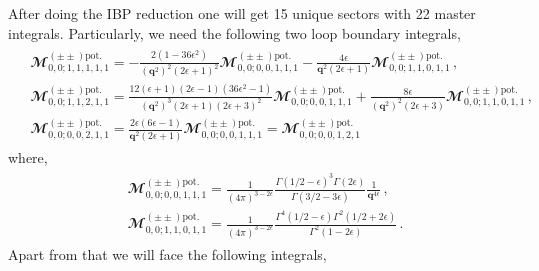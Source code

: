 After doing the IBP reduction one will get 15 unique sectors with 22 master integrals.
Particularly, we need the following two loop boundary integrals,
\begin{align}
    \begin{split}
        &\mathbfcal{M}^{(\pm\pm)\textrm{pot.}}_{0,0;1,1,1,1,1}=-\frac{2 \left(1-36 \epsilon ^2\right)}{\left(\boldsymbol q^2\right)^2 (2 \epsilon +1)^2}\mathbfcal{M}^{(\pm\pm)\textrm{pot.}}_{0,0;0,0,1,1,1}-\frac{4 \epsilon }{\boldsymbol q^2 (2 \epsilon +1)}\mathbfcal{M}^{(\pm\pm)\textrm{pot.}}_{0,0;1,1,0,1,1}\,,\\ &
        \mathbfcal{M}^{(\pm\pm)\textrm{pot.}}_{0,0;1,1,2,1,1}=\frac{12 (\epsilon +1) (2 \epsilon -1) (36 \epsilon^2 -1) }{\left(\boldsymbol q^2\right)^3 (2 \epsilon +1) (2 \epsilon +3)^2}\mathbfcal{M}^{(\pm\pm)\textrm{pot.}}_{0,0;0,0,1,1,1}+\frac{8 \epsilon }{\left(\boldsymbol q^2\right)^2 (2 \epsilon +3)}\mathbfcal{M}^{(\pm\pm)\textrm{pot.}}_{0,0;1,1,0,1,1}\,,\\ &
  \mathbfcal{M}^{(\pm\pm)\textrm{pot.}}_{0,0;0,0,2,1,1}=      \frac{2 \epsilon  (6 \epsilon -1)}{\boldsymbol q^2 (2 \epsilon +1)}\mathbfcal{M}^{(\pm\pm)\textrm{pot.}}_{0,0;0,0,1,1,1}=\mathbfcal{M}^{(\pm\pm)\textrm{pot.}}_{0,0;0,0,1,2,1}
    \end{split}
\end{align}
where,
\begin{align}
    \begin{split}
        &\mathbfcal{M}^{(\pm\pm)\textrm{pot.}}_{0,0;0,0,1,1,1}= \frac{1}{(4\pi)^{3-2\epsilon}}\frac{\Gamma(1/2-\epsilon)^3\Gamma(2\epsilon)}{\Gamma(3/2-3\epsilon)}\frac{1}{\boldsymbol{q}^{4\epsilon}}\,,\\ &
        \mathbfcal{M}^{(\pm\pm)\textrm{pot.}}_{0,0;1,1,0,1,1}=\frac{1}{(4\pi)^{3-2\epsilon}}\frac{\Gamma^4(1/2-\epsilon)\Gamma^2(1/2+2\epsilon)}{\Gamma^2(1-2\epsilon)}\,.
    \end{split}
\end{align}
Apart from that we will face the following integrals,
